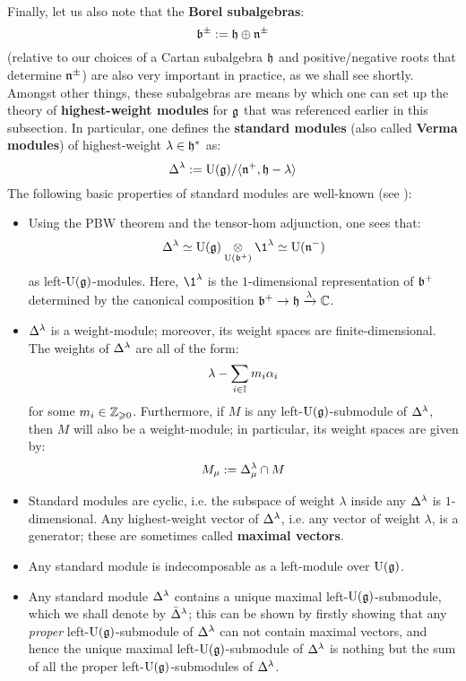         Finally, let us also note that the \textbf{Borel subalgebras}:
            $$\mathfrak{b}^{\pm} := \mathfrak{h} \oplus \mathfrak{n}^{\pm}$$
        (relative to our choices of a Cartan subalgebra $\mathfrak{h}$ and positive/negative roots that determine $\mathfrak{n}^{\pm}$) are also very important in practice, as we shall see shortly. Amongst other things, these subalgebras are means by which one can set up the theory of \textbf{highest-weight modules} for $\mathfrak{g}$ that was referenced earlier in this subsection. In particular, one defines the \textbf{standard modules} (also called \textbf{Verma modules}) of highest-weight $\lambda \in \mathfrak{h}^*$ as:
            $$\Delta^{\lambda} := \mathrm{U}(\mathfrak{g})/\langle \mathfrak{n}^+, \mathfrak{h} - \lambda \rangle$$
        The following basic properties of standard modules are well-known (see \cite[Sections 20 and 21]{humphreys_lie_algebras}):
        \begin{itemize}
            \item Using the PBW theorem and the tensor-hom adjunction, one sees that:
                $$\Delta^{\lambda} \cong \rmU(\g) \tensor_{\rmU(\b^+)} \1^{\lambda} \cong \rmU(\n^-)$$
            as left-$\mathrm{U}(\mathfrak{g})$-modules. Here, $\1^{\lambda}$ is the $1$-dimensional representation of $\mathfrak{b}^+$ determined by the canonical composition $\mathfrak{b}^+ \to \mathfrak{h} \xrightarrow[]{\lambda} \mathbb{C}$.
            \item $\Delta^{\lambda}$ is a weight-module; moreover, its weight spaces are finite-dimensional. The weights of $\Delta^{\lambda}$ are all of the form:
                $$\lambda - \sum_{i \in \mathbb{I}} m_i \alpha_i$$
            for some $m_i \in \mathbb{Z}_{\geqslant 0}$. Furthermore, if $M$ is any left-$\mathrm{U}(\mathfrak{g})$-submodule of $\Delta^{\lambda}$, then $M$ will also be a weight-module; in particular, its weight spaces are given by:
                $$M_{\mu} := \Delta^{\lambda}_{\mu} \cap M$$
            \item Standard modules are cyclic, i.e. the subspace of weight $\lambda$ inside any $\Delta^{\lambda}$ is $1$-dimensional. Any highest-weight vector of $\Delta^{\lambda}$, i.e. any vector of weight $\lambda$, is a generator; these are sometimes called \textbf{maximal vectors}.
            \item Any standard module is indecomposable as a left-module over $\mathrm{U}(\mathfrak{g})$.
            \item Any standard module $\Delta^{\lambda}$ contains a unique maximal left-$\mathrm{U}(\mathfrak{g})$-submodule, which we shall denote by $\bar{\Delta}^{\lambda}$; this can be shown by firstly showing that any \textit{proper} left-$\mathrm{U}(\mathfrak{g})$-submodule of $\Delta^{\lambda}$ can not contain maximal vectors, and hence the unique maximal left-$\mathrm{U}(\mathfrak{g})$-submodule of $\Delta^{\lambda}$ is nothing but the sum of all the proper left-$\mathrm{U}(\mathfrak{g})$-submodules of $\Delta^{\lambda}$.
        \end{itemize}
